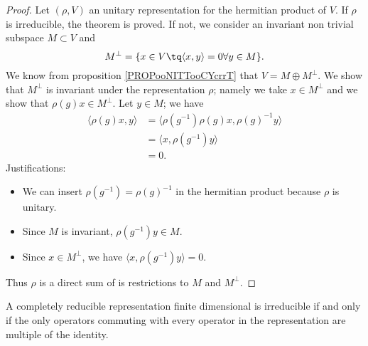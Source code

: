 \begin{proof}
	Let \( (\rho, V)\) an unitary representation for the hermitian product of \( V\). If \( \rho\) is irreducible, the theorem is proved. If not, we consider an invariant non trivial subspace \( M\subset V\) and
	\begin{equation}
		M^{\perp}=\{ x\in V\tq \langle x, y\rangle =0\forall y\in M \}.
	\end{equation}
	We know from proposition \ref{PROPooNITTooCYcrrT} that \( V=M\oplus M^{\perp}\). We show that \( M^{\perp}\) is invariant under the representation \( \rho\); namely we take \( x\in M^{\perp}\) and we show that \( \rho(g)x\in M^{\perp}\). Let \( y\in M\); we have
	\begin{subequations}
		\begin{align}
			\langle \rho(g)x, y\rangle & =\langle \rho(g^{-1})\rho(g)x, \rho(g)^{-1}y\rangle \\
			                           & =\langle x, \rho(g^{-1})y\rangle                    \\
			                           & =0.
		\end{align}
	\end{subequations}
	Justifications:
	\begin{itemize}
		\item We can insert \( \rho(g^{-1})=\rho(g)^{-1}\) in the hermitian product because \( \rho\) is unitary.
		\item Since \( M\) is invariant, \( \rho(g^{-1})y\in M\).
		\item Since \( x\in M^{\perp}\), we have \( \langle x, \rho(g^{-1})y\rangle =0\).
	\end{itemize}
	Thus \( \rho\) is a direct sum of is restrictions to \( M\) and \( M^{\perp}\).
\end{proof}

\begin{proposition}
	A completely reducible representation finite dimensional is irreducible if and only if the only operators commuting with every operator in the representation are multiple of the identity.
\end{proposition}

